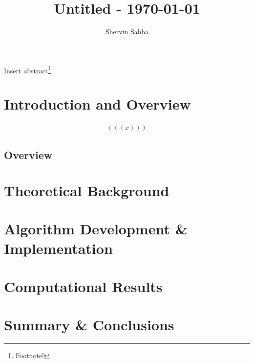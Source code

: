 \documentclass{shervin} %
\begin{document}
\title{Untitled - \today}

\author{Shervin Sahba\authormark{}}
\address{\authormark{}Department of Physics, University of Washington, Seattle, USA.}

\begin{abstract*}
Insert abstract\footnote{Footnote!}
\end{abstract*}


\section{Introduction and Overview} \label{sec: Introduction}

\begin{align}
\boxed{(((x)))}
\end{align}


\subsection{Overview} \label{sec: Overview}

\bigskip
\section{Theoretical Background} \label{sec:Background}

\bigskip
\section{Algorithm Development \& Implementation} \label{sec:Methods}

\bigskip
\section{Computational Results} \label{sec:Results}

\bigskip
\section{Summary \& Conclusions} \label{sec:Conclusion}
\end{document}
